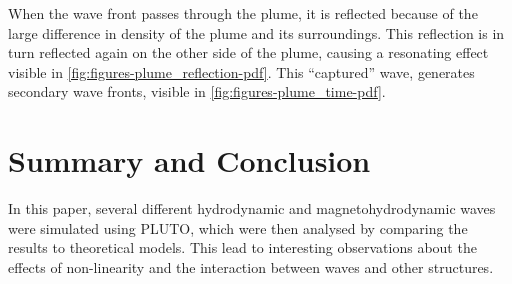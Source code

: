 \documentclass[a4paper]{article}
\numberwithin{figure}{section}
\numberwithin{equation}{section}
\begin{document}
When the wave front passes through the plume, it is reflected because of the large difference in density of the plume and its surroundings. This reflection is in turn reflected again on the other side of the plume, causing a resonating effect visible in \cref{fig:figures-plume_reflection-pdf}. This ``captured'' wave, generates secondary wave fronts, visible in \cref{fig:figures-plume_time-pdf}.

\section{Summary and Conclusion}
In this paper, several different hydrodynamic and magnetohydrodynamic waves were simulated using PLUTO, which were then analysed by comparing the results to theoretical models. This lead to interesting observations about the effects of non-linearity and the interaction between waves and other structures.
\pagebreak
\printbibliography
\end{document}
